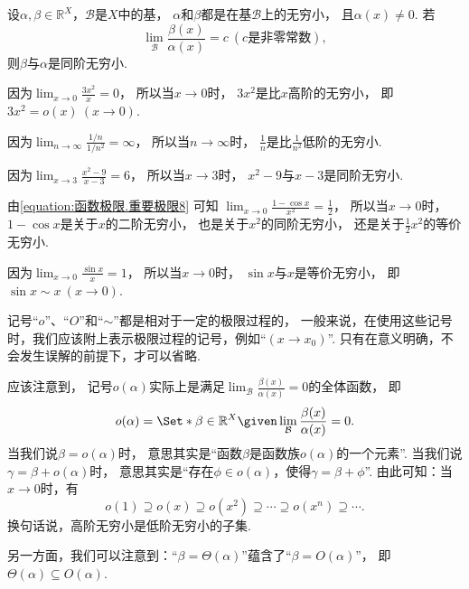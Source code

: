 \begin{proposition}
设\(\alpha,\beta\in\mathbb{R}^X\)，\(\mathcal{B}\)是\(X\)中的基，
\(\alpha\)和\(\beta\)都是在基\(\mathcal{B}\)上的无穷小，
且\(\alpha(x)\neq0\).
若\[
	\lim_\mathcal{B} \frac{\beta(x)}{\alpha(x)} = c\ (\text{$c$是非零常数}),
\]
则\(\beta\)与\(\alpha\)是同阶无穷小.
\end{proposition}

\begin{example}
因为\(\lim_{x\to0} \frac{3x^2}{x} = 0\)，
所以当\(x\to0\)时，
\(3x^2\)是比\(x\)高阶的无穷小，
即\(3x^2 = o(x)\ (x\to0)\).
\end{example}

\begin{example}
因为\(\lim_{n\to\infty} \frac{1/n}{1/n^2} = \infty\)，
所以当\(n\to\infty\)时，
\(\frac{1}{n}\)是比\(\frac{1}{n^2}\)低阶的无穷小.
\end{example}

\begin{example}
因为\(\lim_{x\to3} \frac{x^2-9}{x-3} = 6\)，
所以当\(x\to3\)时，
\(x^2-9\)与\(x-3\)是同阶无穷小.
\end{example}

\begin{example}
由\cref{equation:函数极限.重要极限8} 可知
\(\lim_{x\to0} \frac{1-\cos x}{x^2} = \frac12\)，
所以当\(x\to0\)时，
\(1-\cos x\)是关于\(x\)的二阶无穷小，
也是关于\(x^2\)的同阶无穷小，
还是关于\(\frac12 x^2\)的等价无穷小.
\end{example}

\begin{example}
因为\(\lim_{x\to0} \frac{\sin x}{x} = 1\)，
所以当\(x\to0\)时，
\(\sin x\)与\(x\)是等价无穷小，
即\(\sin x \sim x\ (x\to0)\).
\end{example}

\begin{remark}
记号“\(o\)”、“\(O\)”和“\(\sim\)”都是相对于一定的极限过程的，
一般来说，在使用这些记号时，我们应该附上表示极限过程的记号，例如“\((x \to x_0)\)”.
只有在意义明确，不会发生误解的前提下，才可以省略.
\end{remark}
\begin{remark}
应该注意到，
记号\(o(\alpha)\)实际上是满足\(\lim_\mathcal{B} \frac{\beta(x)}{\alpha(x)} = 0\)的全体函数，
即\[
	o(\alpha) = \Set*{ \beta\in\mathbb{R}^X \given \lim_\mathcal{B} \frac{\beta(x)}{\alpha(x)} = 0 }.
\]
当我们说\(\beta = o(\alpha)\)时，
意思其实是“函数\(\beta\)是函数族\(o(\alpha)\)的一个元素”.
当我们说\(\gamma = \beta + o(\alpha)\)时，
意思其实是“存在\(\phi\in o(\alpha)\)，使得\(\gamma = \beta + \phi\)”.
由此可知：当\(x\to0\)时，有\[
	o(1)
	\supseteq o(x)
	\supseteq o(x^2)
	\supseteq \dotsb
	\supseteq o(x^n)
	\supseteq \dotsb.
\]
换句话说，高阶无穷小是低阶无穷小的子集.

另一方面，我们可以注意到：“\(\beta = \Theta(\alpha)\)”蕴含了“\(\beta = O(\alpha)\)”，
即\(\Theta(\alpha) \subseteq O(\alpha)\).
\end{remark}


